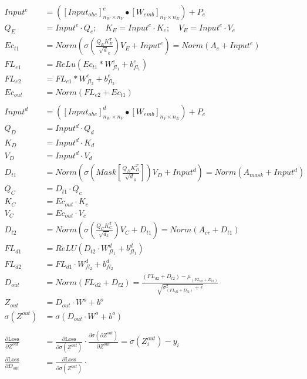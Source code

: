\documentclass[12pt,letterpaper]{article}
\begin{document}
 
\begin{align*}
Input^{e}&=([Input_{ohe}]^{e}_{n_{W} \times n_V } \bullet [W_{emb}]_{n_V \times n_E})+P_e \\
Q_E&=Input^e \cdot Q_{e}; \quad K_E =Input^e \cdot K_{e}; \quad V_E=Input^e \cdot V_{e}\\
Ec_{t1}&=Norm(\sigma(\frac{Q_{E} K_{E}^T}{\sqrt d_k})V_{E}+Input^{e})=Norm(A_{e}+Input^{e})\\
FL_{e1}&=ReLu(Ec_{t1}*W^e_{fl_1}+b^e_{fl_1})\\
FL_{e2}&=FL_{e1}*W^e_{fl_2}+b^e_{fl_2}\\
Ec_{out}&=Norm(FL_{e2}+Ec_{t1})\\ \\
Input^{d}&=([Input_{ohe}]^{d}_{n_{W} \times n_V } \bullet [W_{emb}]_{n_V \times n_E})+P_e \\
Q_D&=Input^d \cdot Q_{d}\\
K_D&=Input^d \cdot K_{d}\\
V_D&=Input^d \cdot V_{d}\\
D_{t1}&=Norm(\sigma(Mask[\frac{Q_{D} K_{D}^T}{\sqrt d_k}])V_{D}+Input^{d})=Norm(A_{mask}+Input^d)\\
Q_C &= D_{t1} \cdot Q_{c}  \\
K_C &= Ec_{out} \cdot K_{c} \\
V_C &= Ec_{out} \cdot V_{c} \\
D_{t2} &= Norm\left(\sigma\left(\frac{Q_{C} K_{C}^T}{\sqrt{d_k}}\right) V_{C} + D_{t1}\right) = Norm(A_{cr}+D_{t1}) \\ %
FL_{d1} &= ReLU(D_{t2} \cdot W^d_{fl_1} + b^d_{fl_1}) \\
FL_{d2} &= FL_{d1} \cdot W^d_{fl_2} + b^d_{fl_2} \\
D_{out} &= Norm(FL_{d2} + D_{t2}) =\frac{(FL_{d2} + D_{t2})-\mu_{(FL_{d2} + D_{t2})}}{\sqrt{\sigma^2_{(FL_{d2} + D_{t2})}+\epsilon}}\\
Z_{out} &= D_{out} \cdot W^o + b^o \\
\sigma(Z^{out}) &= \sigma(D_{out} \cdot W^o + b^o) 
\\\\%
\frac{\partial \text{Loss}}{\partial Z^{out}} &= %
\frac{\partial \text{Loss}}{\partial \sigma(Z^{out})} \cdot 
\frac{\partial \sigma(\partial Z^{out})}{\partial Z^{out}} = 
\sigma(Z^{out}_i) - y_i 
\\
\frac{\partial \text{Loss}}{\partial D_{out}} &= %
\frac{\partial \text{Loss}}{\partial \sigma(Z^{out})} \cdot 

\end{align*}
\end{document}
